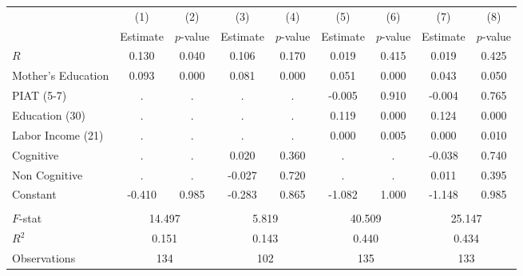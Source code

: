 \begin{tabular}{lcccccccc} \toprule
 & (1) & (2) & (3) & (4) & (5) & (6) & (7) & (8) \\ 
 & Estimate  & $p$-value  & Estimate  & $p$-value  & Estimate  & $p$-value  & Estimate  & $p$-value  \\  \midrule
$R$ &     0.130 &     0.040 &     0.106 &     0.170 &     0.019 &     0.415 &     0.019 &     0.425 \\  
Mother's Education &     0.093 &     0.000 &     0.081 &     0.000 &     0.051 &     0.000 &     0.043 &     0.050 \\  
PIAT (5-7) &         . &         . &         . &         . &    -0.005 &     0.910 &    -0.004 &     0.765 \\  
Education (30) &         . &         . &         . &         . &     0.119 &     0.000 &     0.124 &     0.000 \\  
Labor Income (21) &         . &         . &         . &         . &     0.000 &     0.005 &     0.000 &     0.010 \\  
Cognitive &         . &         . &     0.020 &     0.360 &         . &         . &    -0.038 &     0.740 \\  
Non Cognitive &         . &         . &    -0.027 &     0.720 &         . &         . &     0.011 &     0.395 \\  
Constant &    -0.410 &     0.985 &    -0.283 &     0.865 &    -1.082 &     1.000 &    -1.148 &     0.985 \\  \\ \midrule
$F$-stat &    \multicolumn{2}{c}{14.497} &          \multicolumn{2}{c}{5.819} &         \multicolumn{2}{c}{40.509} &           \multicolumn{2}{c}{25.147} \\  
$R^2$ &     \multicolumn{2}{c}{0.151} &          \multicolumn{2}{c}{0.143} &              \multicolumn{2}{c}{0.440} &          \multicolumn{2}{c}{0.434} \\  
Observations &   \multicolumn{2}{c}{134} &           \multicolumn{2}{c}{102} &          \multicolumn{2}{c}{135} &         \multicolumn{2}{c}{133} \\  \bottomrule \end{tabular}
